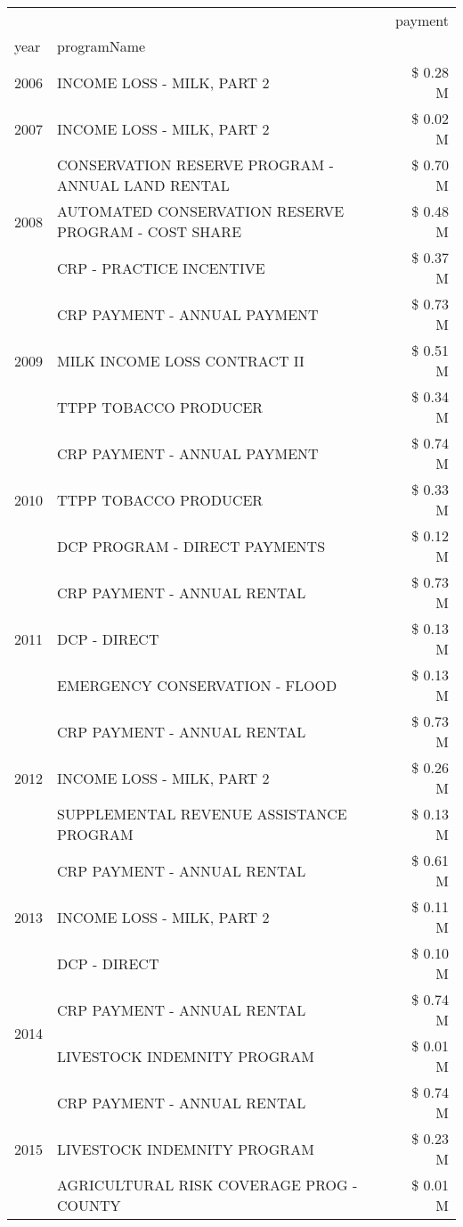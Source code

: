 \begin{tabular}{llr}
\toprule
 &  & payment \\
year & programName &  \\
\midrule
2006 & INCOME LOSS - MILK, PART 2 & \$ 0.28 M \\
\cline{1-3}
2007 & INCOME LOSS - MILK, PART 2 & \$ 0.02 M \\
\cline{1-3}
\multirow[t]{3}{*}{2008} & CONSERVATION RESERVE PROGRAM - ANNUAL LAND RENTAL & \$ 0.70 M \\
 & AUTOMATED CONSERVATION RESERVE PROGRAM - COST SHARE & \$ 0.48 M \\
 & CRP - PRACTICE INCENTIVE & \$ 0.37 M \\
\cline{1-3}
\multirow[t]{3}{*}{2009} & CRP PAYMENT - ANNUAL PAYMENT & \$ 0.73 M \\
 & MILK INCOME LOSS CONTRACT II & \$ 0.51 M \\
 & TTPP TOBACCO PRODUCER & \$ 0.34 M \\
\cline{1-3}
\multirow[t]{3}{*}{2010} & CRP PAYMENT - ANNUAL PAYMENT & \$ 0.74 M \\
 & TTPP TOBACCO PRODUCER & \$ 0.33 M \\
 & DCP PROGRAM - DIRECT PAYMENTS & \$ 0.12 M \\
\cline{1-3}
\multirow[t]{3}{*}{2011} & CRP PAYMENT - ANNUAL RENTAL & \$ 0.73 M \\
 & DCP - DIRECT & \$ 0.13 M \\
 & EMERGENCY CONSERVATION - FLOOD & \$ 0.13 M \\
\cline{1-3}
\multirow[t]{3}{*}{2012} & CRP PAYMENT - ANNUAL RENTAL & \$ 0.73 M \\
 & INCOME LOSS - MILK, PART 2 & \$ 0.26 M \\
 & SUPPLEMENTAL REVENUE ASSISTANCE PROGRAM & \$ 0.13 M \\
\cline{1-3}
\multirow[t]{3}{*}{2013} & CRP PAYMENT - ANNUAL RENTAL & \$ 0.61 M \\
 & INCOME LOSS - MILK, PART 2 & \$ 0.11 M \\
 & DCP - DIRECT & \$ 0.10 M \\
\cline{1-3}
\multirow[t]{2}{*}{2014} & CRP PAYMENT - ANNUAL RENTAL & \$ 0.74 M \\
 & LIVESTOCK INDEMNITY PROGRAM & \$ 0.01 M \\
\cline{1-3}
\multirow[t]{3}{*}{2015} & CRP PAYMENT - ANNUAL RENTAL & \$ 0.74 M \\
 & LIVESTOCK INDEMNITY PROGRAM & \$ 0.23 M \\
 & AGRICULTURAL RISK COVERAGE PROG - COUNTY & \$ 0.01 M \\

\end{tabular}
